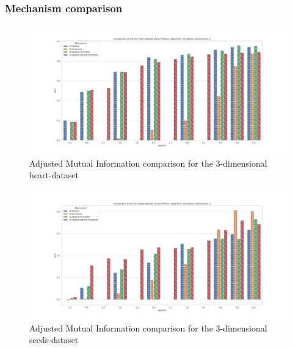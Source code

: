 \subsubsection*{Mechanism comparison}
\begin{figure}[H]
    \includegraphics[width=\textwidth]{Results/RQ2/heart-dataset/ami_heart-dataset_comparison.png}
    \caption{Adjusted Mutual Information comparison for the 3-dimensional heart-dataset}
    \label{fig:ami_heart-dataset_comparison_3d}
\end{figure}
\begin{figure}[H]
    \includegraphics[width=\textwidth]{Results/RQ2/seeds-dataset/ami_seeds-dataset_comparison.png}
    \caption{Adjusted Mutual Information comparison for the 3-dimensional seeds-dataset}
    \label{fig:ami_seeds-dataset_comparison_3d}
\end{figure}

